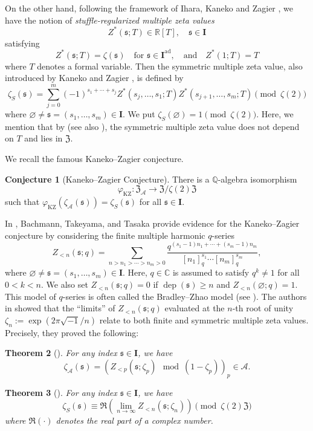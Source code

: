 \documentclass[12pt,reqno]{amsart}
\numberwithin{equation}{section}
\theoremstyle{plain}
\newtheorem{thm}{Theorem}[section]
\theoremstyle{definition}
\newtheorem{conj}[thm]{Conjecture}
\theoremstyle{remark}
\newcommand{\QQ}{\mathbb{Q}}
\newcommand{\CC}{\mathbb{C}}
\newcommand{\Acal}{\mathcal{A}}
\newcommand{\dep}{\operatorname{dep}}
\newcommand{\ww}[1]{\mathfrak{#1}}
\newcommand{\Ical}{\mathbf{I}}
\newcommand{\Zcal}{\mathfrak{Z}}
\begin{document}
On the other hand, following the framework of Ihara, Kaneko and Zagier \cite[Proposition 1]{IKZ06}, we have the notion of \textit{stuffle-regularized multiple zeta values} $$Z^\ast(\ww{s};T) \in \mathbb{R}[T],\quad \ww{s}\in\Ical$$ satisfying
\[
Z^\ast(\ww{s};T) = \zeta(\ww{s})\quad \text{for } \ww{s}\in\Ical^{\mathrm{ad}}, \quad\text{and}\quad Z^\ast(1;T) = T
\]
where $T$ denotes a formal variable.
Then the symmetric multiple zeta value, also introduced by Kaneko and Zagier \cite[(87), (88)]{KanekoZagier}, is defined by 
$$\zeta_{S}(\ww{s})=\sum_{j=0}^m(-1)^{s_1+\cdots+s_j}Z^\ast(s_j,\ldots,s_1;T)Z^\ast(s_{j+1},\ldots,s_m;T)\pmod {\zeta(2)}$$
where $\varnothing\neq \ww{s}=(s_1,\ldots,s_m)\in\Ical$. We put $\zeta_S(\varnothing)=1\pmod{\zeta(2)}$. Here, we mention that by \cite[Theorem 3]{KanekoZagier} (see also \cite{Kaneko2019}), the symmetric multiple zeta value does not depend on
$T$ and lies in $\Zcal$.

We recall the famous Kaneko--Zagier conjecture.
\begin{conj}[Kaneko--Zagier Conjecture]
    There is a $\QQ$-algebra isomorphism $$\varphi_{\textrm{KZ}}:\Zcal_{\Acal}\to\Zcal/\zeta(2)\Zcal$$ such that $\varphi_{\textrm{KZ}}(\zeta_\Acal(\ww{s}))=\zeta_S(\ww{s})$
    for all $\ww{s}\in\Ical$.
\end{conj}

In \cite{BTT18}, Bachmann, Takeyama, and Tasaka provide evidence for the Kaneko--Zagier conjecture by considering the finite multiple harmonic $q$-series
\[
Z_{<n}(\ww{s};q) = \sum_{n > n_1 > \cdots > n_m > 0} 
\frac{q^{(s_1-1)n_1 + \cdots + (s_m-1)n_m}}{[n_1]_q^{s_1} \cdots [n_m]_q^{s_m}},
\]
where $\varnothing \neq \ww{s}=(s_1,\ldots,s_m) \in \Ical$. Here, $q \in \CC$ is assumed to satisfy $q^{k} \neq 1$ for all $0 < k < n$. We also set $Z_{<n}(\ww{s}; q) = 0$ if $\dep(\ww{s}) \geq n$ and $Z_{<n}(\varnothing; q) = 1$. This model of $q$-series is often called the Bradley--Zhao model (see \cite{Bradley2005, Zhao2007}). The authors in \cite{BTT18} showed that the ``limits'' of $Z_{<n}(\ww{s};q)$ evaluated at the $n$-th root of unity $\zeta_n:=\exp(2\pi\sqrt{-1}/n)$ relate to both finite and symmetric multiple zeta values. Precisely, they proved the following:
\begin{thm}[{\cite[Theorem 1.1]{BTT18}}]\label{thm:1.1}
    For any index $\ww{s}\in\Ical$, we have
    $$\zeta_\Acal(\ww{s})=\left(Z_{<p}(\ww{s};\zeta_p)\mod (1-\zeta_p)\right)_p\in\Acal.$$
\end{thm}
\begin{thm}[{\cite[Theorem 1.2]{BTT18}}]\label{thm:1.2}
    For any index $\ww{s}\in\Ical$, we have
    $$\zeta_S(\ww{s})\equiv\Re\left(\lim_{n\to\infty}Z_{<n}(\ww{s};\zeta_n)\right)\pmod {\zeta(2)\Zcal}$$
    where $\Re(\cdot)$ denotes the real part of a complex number.
\end{thm}
\end{document}
